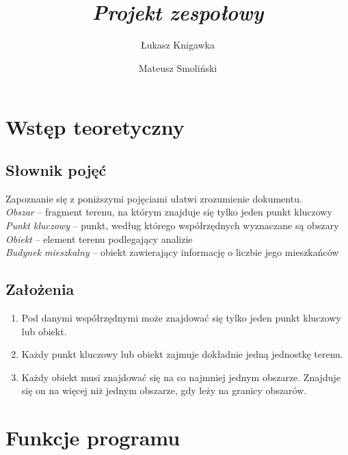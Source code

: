 \documentclass[a4paper,12pt]{article}
\title{ \sc{Specyfikacja funkcjonalna} \\
\emph{Projekt zespołowy} }
\author{Łukasz Knigawka \and Mateusz Smoliński}
\newcommand\tab[1][0.6cm]{\hspace*{#1} }
\begin{document}
\maketitle

\thispagestyle{empty}

\tableofcontents

\newpage

\section{Wstęp teoretyczny}

\subsection{Słownik pojęć}

\tab Zapoznanie się z poniższymi pojęciami ułatwi zrozumienie dokumentu. 
\\\textit{Obszar} -- fragment terenu, na którym znajduje się tylko jeden punkt kluczowy
\\\textit{Punkt kluczowy} -- punkt, według którego współrzędnych wyznaczane są obszary
\\\textit{Obiekt} -- element terenu podlegający analizie
\\\textit{Budynek mieszkalny} -- obiekt zawierający informację o liczbie jego mieszkańców

\subsection{Założenia}

\begin{enumerate}
\item Pod danymi współrzędnymi może znajdować się tylko jeden punkt kluczowy lub obiekt.
\item Każdy punkt kluczowy lub obiekt zajmuje dokładnie jedną jednostkę terenu.
\item Każdy obiekt musi znajdować się na co najmniej jednym obszarze. Znajduje się on na więcej niż jednym obszarze, gdy leży na granicy obszarów.
\end{enumerate}

\section{Funkcje programu}
\end{document}
